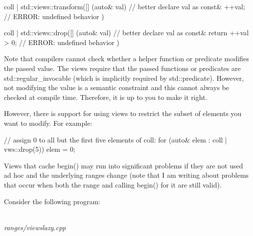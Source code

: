 \begin{cpp}
coll | std::views::transform([] (auto& val) { // better declare val as const&
	++val; // ERROR: undefined behavior
})

coll | std::views::drop([] (auto& val) { // better declare val as const&
	return ++val > 0; // ERROR: undefined behavior
})
\end{cpp}

Note that compilers cannot check whether a helper function or predicate modifies the passed value. The views require that the passed functions or predicates are std::regular\_invocable (which is implicitly required by std::predicate). However, not modifying the value is a semantic constraint and this cannot always be checked at compile time. Therefore, it is up to you to make it right.

However, there is support for using views to restrict the subset of elements you want to modify. For example:

\begin{cpp}
// assign 0 to all but the first five elements of coll:
for (auto& elem : coll | vws::drop(5)) {
	elem = 0;
}
\end{cpp}


Views that cache begin() may run into significant problems if they are not used ad hoc and the underlying ranges change (note that I am writing about problems that occur when both the range and calling begin() for it are still valid).

Consider the following program:

\noindent
\hspace*{\fill} \\ %
\textit{ranges/viewslazy.cpp}

